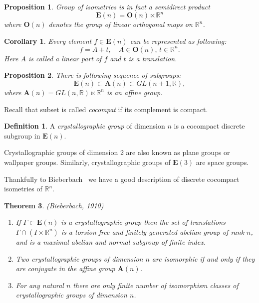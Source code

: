 \documentclass[a4paper,12pt]{amsart}
\newtheorem{theorem}{Theorem}
\newtheorem{proposition}[theorem]{Proposition}
\newtheorem{corollary}{Corollary}[theorem]
\theoremstyle{definition}
\newtheorem{definition}{Definition}
\begin{document}
	
	\begin{proposition} Group of isometries is in fact a semidirect product
		$$\mathbf{E}(n) = \mathbf{O}(n) \ltimes \mathbb{R}^n$$
		where $\mathbf{O}(n)$ denotes the group of linear orthogonal maps on $\mathbb{R}^n$.
	\end{proposition}
	
	\begin{corollary}
		Every element $f \in \mathbf{E}(n)$ can be represented as following: 
		$$
		f = A + t, \quad A \in \mathbf{O}(n), \, t \in \mathbb{R}^n.
		$$
		Here $A$ is called a linear part of $f$ and $t$ is a translation.
	\end{corollary}
	
	
	\begin{proposition}
		There is following sequence of subgroups: 
		$$
		\mathbf{E}(n) \subset \mathbf{A}(n) \subset GL(n + 1, \mathbb{R}),
		$$
		where $\mathbf{A}(n) = GL(n, \mathbb{R}) \ltimes \mathbb{R}^n$ is an affine group.
	\end{proposition}
	
	Recall that subset is called \textit{cocompat} if its complement is compact.
	
	\begin{definition}
		A \textit{crystallographic group} of dimension $n$ is a cocompact discrete subgroup in $\mathbf{E}(n)$.
		
		Crystallographic groups of dimension 2 are also known as plane groups or wallpaper groups. Similarly, crystallographic groups of $\mathbf{E}(3)$ are space groups. 
		
	\end{definition}
	
	Thankfully to Bieberbach~\cite{Bieberbach:Original} we have a good description of discrete cocompact isometries of $\mathbb{R}^n$.
	
	\begin{theorem}
		(Bieberbach, 1910)
		\begin{enumerate}[label=\arabic*.]
			\item If $\Gamma \subset \mathbf{E}(n)$ is a crystallographic group then the set of translations $\Gamma \cap (I \times \mathbb{R}^n)$ is a torsion free and finitely generated abelian group of rank $n$, and is a maximal abelian and normal subgroup of finite index.
			\item Two crystallographic groups of dimension $n$ are isomorphic if and only if they are conjugate in the affine group $\mathbf{A}(n)$.
			
			\item For any natural $n$ there are only finite number of isomorphism classes of crystallographic groups of dimension $n$.			
		\end{enumerate}
		
	
	\end{theorem}
	
\end{document}
